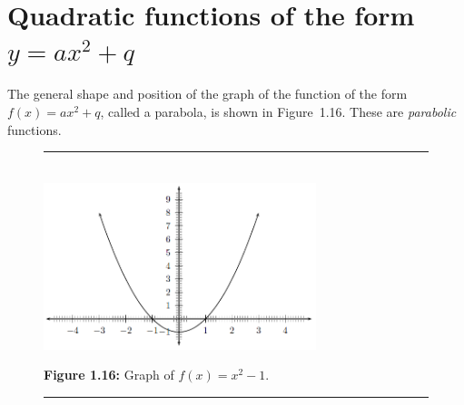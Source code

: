 % 
%     
%     
%     
\par 
\label{m39345*uid101}
\section{ Quadratic functions of the form $y=a{x}^{2}+q$}
\nopagebreak
{}         
\label{m39345*id240272}The general shape and position of the graph of the function of the form $f\left(x\right)=a{x}^{2}+q$, called a parabola, is shown in Figure~1.16. These are \textsl{parabolic} functions.\par 
\setcounter{subfigure}{0}
\begin{figure}[H] %
\begin{center}
\rule[.1in]{\figurerulewidth}{.005in} \\
\label{m39345*uid102!!!underscore!!!media}\label{m39345*uid102!!!underscore!!!printimage}\includegraphics[width=300px]{col11306.imgs/m39345_MG10C11_013.png} %
\vspace{2pt}
\vspace{\rubberspace}\par \begin{cnxcaption}
\small \textbf{Figure 1.16: }Graph of $f\left(x\right)={x}^{2}-1$.
\end{cnxcaption}
\vspace{.1in}
\rule[.1in]{\figurerulewidth}{.005in} \\
\end{center}
\end{figure}       
